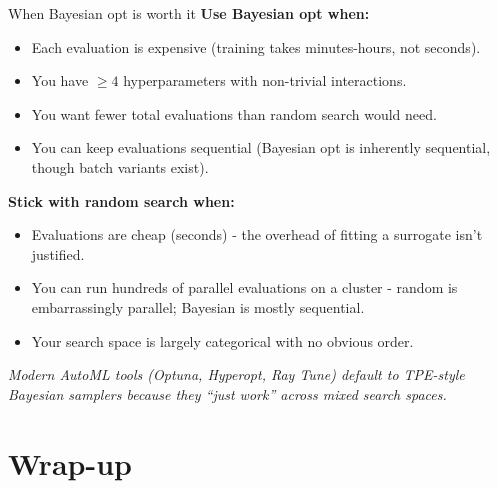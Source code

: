 \documentclass[aspectratio=169]{beamer}
\begin{document}
\begin{frame}{When Bayesian opt is worth it}
  \textbf{Use Bayesian opt when:}
  \begin{itemize}\small
    \item Each evaluation is expensive (training takes minutes-hours, not seconds).
    \item You have $\geq 4$ hyperparameters with non-trivial interactions.
    \item You want fewer total evaluations than random search would need.
    \item You can keep evaluations sequential (Bayesian opt is inherently sequential, though batch variants exist).
  \end{itemize}
  \vfill
  \textbf{Stick with random search when:}
  \begin{itemize}\small
    \item Evaluations are cheap (seconds) - the overhead of fitting a surrogate isn't justified.
    \item You can run hundreds of parallel evaluations on a cluster - random is embarrassingly parallel; Bayesian is mostly sequential.
    \item Your search space is largely categorical with no obvious order.
  \end{itemize}
  \vfill
  \vfill
  \emph{Modern AutoML tools (Optuna, Hyperopt, Ray Tune) default to TPE-style Bayesian samplers because they ``just work'' across mixed search spaces.}
\end{frame}

\section{Wrap-up}
\end{document}
